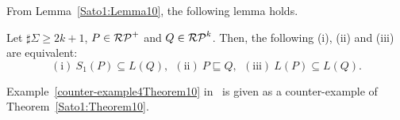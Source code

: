 From Lemma~\ref{Sato1:Lemma10}, the following lemma holds.
\begin{thm}\label{定理10}\label{Sato1:Theorem10}
    Let $\sharp\Sigma \geq 2k+1$, $P \in \mathcal{RP}^{+}$ and $Q \in \mathcal{RP}^{k}$.
    Then, the following (i), (ii) and (iii) are equivalent:
    \[
        (\mathrm{i})\ S_{1}(P) \subseteq L(Q),\ \
        (\mathrm{ii})\ P \sqsubseteq Q,\ \
        (\mathrm{iii})\ L(P) \subseteq L(Q).
    \]
\end{thm}
%

Example~\ref{counter-example4Theorem10} in~\cite{Sato1} is given as a counter-example of Theorem~\ref{Sato1:Theorem10}.%
